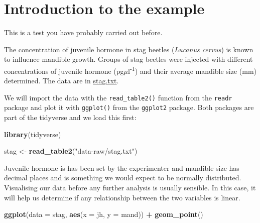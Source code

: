 \documentclass[
]{book}
\newenvironment{Shaded}{\begin{snugshade}}{\end{snugshade}}
\newcommand{\DataTypeTok}[1]{\textcolor[rgb]{0.13,0.29,0.53}{#1}}
\newcommand{\KeywordTok}[1]{\textcolor[rgb]{0.13,0.29,0.53}{\textbf{#1}}}
\newcommand{\NormalTok}[1]{#1}
\newcommand{\OperatorTok}[1]{\textcolor[rgb]{0.81,0.36,0.00}{\textbf{#1}}}
\newcommand{\StringTok}[1]{\textcolor[rgb]{0.31,0.60,0.02}{#1}}
\begin{document}
\hypertarget{introduction-to-the-example}{%
\section{Introduction to the example}\label{introduction-to-the-example}}

This is a test you have probably carried out before.

The concentration of juvenile hormone in stag beetles (\emph{Lucanus cervus}) is known to influence mandible growth. Groups of stag beetles were injected with different concentrations of juvenile hormone (pg\(\mu\)l\textsuperscript{-1}) and their average mandible size (mm) determined. The data are in \href{data-raw/stag.txt}{stag.txt}.

We will import the data with the \texttt{read\_table2()} function from the \texttt{readr} package and plot it with \texttt{ggplot()} from the \texttt{ggplot2} package. Both packages are part of the tidyverse and we load this first:

\begin{Shaded}
\begin{Highlighting}[]
\KeywordTok{library}\NormalTok{(tidyverse)}
\end{Highlighting}
\end{Shaded}

\begin{Shaded}
\begin{Highlighting}[]
\NormalTok{stag <-}\StringTok{ }\KeywordTok{read_table2}\NormalTok{(}\StringTok{"data-raw/stag.txt"}\NormalTok{)}
\end{Highlighting}
\end{Shaded}

Juvenile hormone is has been set by the experimenter and mandible size has decimal places and is something we would expect to be normally distributed. Visualising our data before any further analysis is usually sensible. In this case, it will help us determine if any relationship between the two variables is linear.

\begin{Shaded}
\begin{Highlighting}[]
\KeywordTok{ggplot}\NormalTok{(}\DataTypeTok{data =}\NormalTok{ stag, }\KeywordTok{aes}\NormalTok{(}\DataTypeTok{x =}\NormalTok{ jh, }\DataTypeTok{y =}\NormalTok{ mand)) }\OperatorTok{+}
\StringTok{        }\KeywordTok{geom_point}\NormalTok{()}
\end{Highlighting}
\end{Shaded}
\end{document}
